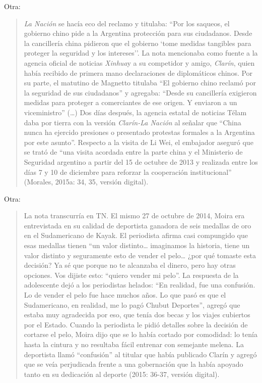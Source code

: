 Otra:

\begin{quote}
\emph{La Nación} se hacía eco del reclamo y titulaba: ``Por los saqueos, el gobierno chino pide a la Argentina protección para sus ciudadanos. Desde la cancillería china pidieron que el gobierno `tome medidas tangibles para proteger la seguridad y los intereses''. La nota mencionaba como fuente a la agencia oficial de noticias \emph{Xinhua}y a su competidor y amigo, \emph{Clarín}, quien había recibido de primera mano declaraciones de diplomáticos chinos. Por su parte, el matutino de Magnetto titulaba ``El gobierno chino reclamó por la seguridad de sus ciudadanos'' y agregaba: ``Desde su cancillería exigieron medidas para proteger a comerciantes de ese origen. Y enviaron a un viceministro'' (\ldots) Dos días después, la agencia estatal de noticias Télam daba por tierra con la versión \emph{Clarín-La Nación} al señalar que ``China nunca ha ejercido presiones o presentado protestas formales a la Argentina por este asunto''. Respecto a la visita de Li Wei, el embajador aseguró que se trató de ``una visita acordada entre la parte china y el Ministerio de Seguridad argentino a partir del 15 de octubre de 2013 y realizada entre los días 7 y 10 de diciembre para reforzar la cooperación institucional'' (Morales, 2015a: 34, 35, versión digital).
\end{quote}

Otra:

\begin{quote}
La nota transcurría en TN. El mismo 27 de octubre de 2014, Moira era entrevistada en su calidad de deportista ganadora de seis medallas de oro en el Sudamericano de Kayak. El periodista afirma casi compungido que esas medallas tienen ``un valor distinto\ldots{} imaginamos la historia, tiene un valor distinto y seguramente esto de vender el pelo\ldots{} ¿por qué tomaste esta decisión? Ya sé que porque no te alcanzaba el dinero, pero hay otras opciones. Vos dijiste esto: ``quiero vender mi pelo''. La respuesta de la adolescente dejó a los periodistas helados: ``En realidad, fue una confusión. Lo de vender el pelo fue hace muchos años. Lo que pasó es que el Sudamericano, en realidad, me lo pagó Chubut Deportes'', agregó que estaba muy agradecida por eso, que tenía dos becas y los viajes cubiertos por el Estado. Cuando la periodista le pidió detalles sobre la decisión de cortarse el pelo, Moira dijo que se lo había cortado por comodidad: lo tenía hasta la cintura y no resultaba fácil entrenar con semejante melena. La deportista llamó ``confusión'' al titular que había publicado Clarín y agregó que se veía perjudicada frente a una gobernación que la había apoyado tanto en su dedicación al deporte (2015: 36-37, versión digital).
\end{quote}

